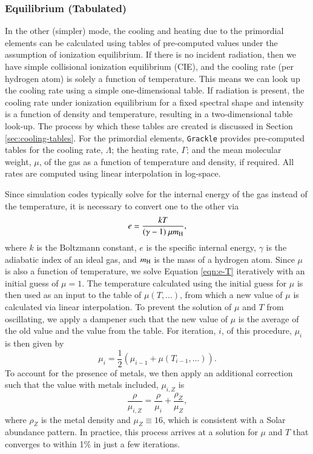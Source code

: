\subsubsection{Equilibrium (Tabulated)} \label{sec:pri-tab}

In the other (simpler) mode, the cooling and heating due to the primordial
elements can be calculated using tables of pre-computed values under
the assumption of ionization equilibrium.  If there is
no incident radiation, then we have simple collisional ionization
equilibrium (CIE), and the cooling rate (per hydrogen atom) is solely a function of
temperature.  This means we can look up the cooling rate using a simple
one-dimensional table.   If radiation is present, the cooling rate under
ionization equilibrium for a fixed spectral shape and intensity is a
function of density and temperature, resulting in a two-dimensional table
look-up.  The process by which these tables are
created is discussed in Section \ref{sec:cooling-tables}.  For the
primordial elements, \texttt{Grackle} provides pre-computed tables for the cooling rate, $\Lambda$;
the heating rate, $\Gamma$; and the mean molecular weight, $\mu$, of
the gas as a function of temperature and density, if required.  All rates
are computed using linear interpolation in log-space.

Since simulation codes typically solve for the internal energy of the gas
instead of the temperature, it is necessary to convert one to the
other via
\begin{equation} \label{eqn:e-T}
e = \frac{k T}{(\gamma - 1)\ \mu m_{\rm H}},
\end{equation}
where $k$ is the Boltzmann constant, $e$ is
the specific internal energy, $\gamma$ is the adiabatic index of an
ideal gas, and $m_{\rm H}$ is the mass of a hydrogen atom.  Since $\mu$ is also a
function of temperature, we solve Equation \ref{eqn:e-T} iteratively
with an initial guess of $\mu = 1$.  The temperature calculated using
the initial guess for $\mu$ is then used as an input to the table of
$\mu(T,...)$, from which a new value of $\mu$ is calculated via
linear interpolation.  To prevent the solution of $\mu$ and $T$ from
oscillating, we apply a dampener such that the new value of $\mu$ is
the average of the old value and the value from the table.  For
iteration, $i$, of this procedure, $\mu_{i}$ is then given by
\begin{equation}
\mu_{i} = \frac{1}{2} (\mu_{i-1} + \mu(T_{i-1},...)).
\end{equation}
To account for the presence of metals, we then apply an additional
correction such that the value with metals included, $\mu_{i, Z}$ is
\begin{equation}
\frac{\rho}{\mu_{i, Z}} = \frac{\rho}{\mu_{i}} +
\frac{\rho_{Z}}{\mu_{Z}},
\end{equation}
where $\rho_{Z}$ is the metal density and $\mu_{Z} \equiv 16$, which
is consistent with a Solar abundance pattern.  In practice, this
process arrives at a solution for $\mu$ and $T$ that converges to
within 1\% in just a few iterations.

